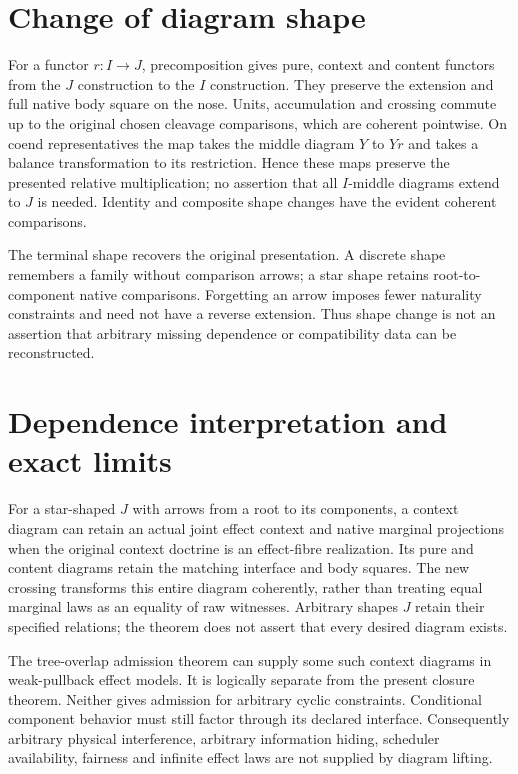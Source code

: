 \documentclass[11pt]{article}
\begin{document}
\section{Change of diagram shape}
For a functor $r:I\to J$, precomposition gives pure, context and content functors from the $J$ construction to the $I$ construction. They preserve the extension and full native body square on the nose. Units, accumulation and crossing commute up to the original chosen cleavage comparisons, which are coherent pointwise. On coend representatives the map takes the middle diagram $Y$ to $Y r$ and takes a balance transformation to its restriction. Hence these maps preserve the presented relative multiplication; no assertion that all $I$-middle diagrams extend to $J$ is needed. Identity and composite shape changes have the evident coherent comparisons.

The terminal shape recovers the original presentation. A discrete shape remembers a family without comparison arrows; a star shape retains root-to-component native comparisons. Forgetting an arrow imposes fewer naturality constraints and need not have a reverse extension. Thus shape change is not an assertion that arbitrary missing dependence or compatibility data can be reconstructed.

\section{Dependence interpretation and exact limits}
For a star-shaped $J$ with arrows from a root to its components, a context diagram can retain an actual joint effect context and native marginal projections when the original context doctrine is an effect-fibre realization. Its pure and content diagrams retain the matching interface and body squares. The new crossing transforms this entire diagram coherently, rather than treating equal marginal laws as an equality of raw witnesses. Arbitrary shapes $J$ retain their specified relations; the theorem does not assert that every desired diagram exists.

The tree-overlap admission theorem can supply some such context diagrams in weak-pullback effect models. It is logically separate from the present closure theorem. Neither gives admission for arbitrary cyclic constraints. Conditional component behavior must still factor through its declared interface. Consequently arbitrary physical interference, arbitrary information hiding, scheduler availability, fairness and infinite effect laws are not supplied by diagram lifting.
\end{document}
